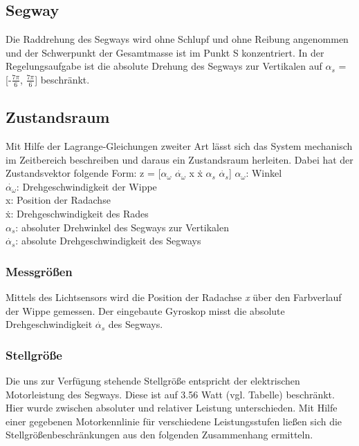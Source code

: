 \documentclass[pdf]{ifacconf}
\begin{document}
	\subsection{Segway}
	Die Raddrehung des Segways wird ohne Schlupf und ohne Reibung angenommen und der 		Schwerpunkt der Gesamtmasse ist im Punkt S konzentriert. 
	In der Regelungsaufgabe ist die absolute Drehung des Segways zur Vertikalen auf 		$\alpha^{}_{s}$ = [-$\frac{7\pi}{6}$, $\frac{7\pi}{6}$] beschränkt. %

	\subsection{Zustandsraum}
	Mit Hilfe der Lagrange-Gleichungen zweiter Art lässt sich das System mechanisch 		im Zeitbereich beschreiben und daraus ein Zustandsraum herleiten.
	Dabei hat der Zustandsvektor folgende Form:
	z = [$\alpha^{}_{\omega}$ $\dot{\alpha^{}_{\omega}}$ x \.{x} $\alpha^{}_{s}$ $\dot{\alpha^{}_{s}}$]%
	$\alpha^{}_{\omega}$: Winkel\\
	$\dot{\alpha^{}_{\omega}}$: Drehgeschwindigkeit der Wippe\\
	x:  Position der Radachse\\
	\.{x}:  Drehgeschwindigkeit des Rades\\
	$\alpha^{}_{s}$: absoluter Drehwinkel des Segways zur Vertikalen\\
	$\dot{\alpha^{}_{s}}$: absolute Drehgeschwindigkeit des Segways\\
	
		\subsubsection{Messgrößen}
		Mittels des Lichtsensors wird die Position der Radachse \textit{x} über den 		Farbverlauf der Wippe gemessen. Der eingebaute Gyroskop misst die absolute Drehgeschwindigkeit $\dot{\alpha^{}_{s}}$ des Segways.
		
		\subsubsection{Stellgröße}
		Die uns zur Verfügung stehende Stellgröße entspricht der elektrischen Motorleistung des Segways. Diese ist auf 3.56 Watt (vgl. Tabelle) beschränkt.
		Hier wurde zwischen absoluter und relativer Leistung unterschieden. Mit Hilfe einer gegebenen Motorkennlinie für verschiedene Leistungsstufen ließen sich die Stellgrößenbeschränkungen aus den folgenden Zusammenhang ermitteln.
\end{document}

